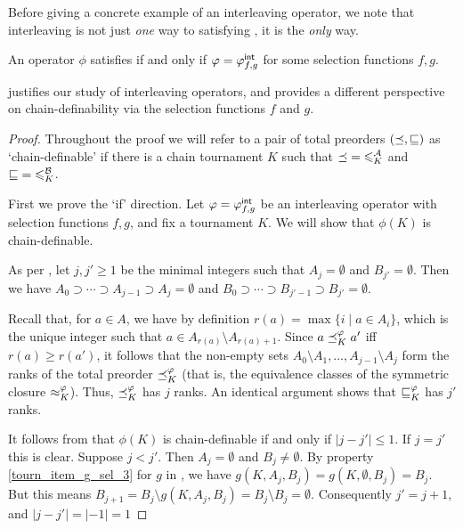 Before giving a concrete example of an interleaving operator, we note that
interleaving is not just \emph{one} way to satisfying \chaindef{}, it
is the \emph{only} way.

\begin{theorem}
   \label{tourn_result_chaindef_iff_interleaving}

    An operator $\phi$ satisfies \chaindef{} if and only if $\varphi =
    {\varphi_{f,g}^\mathsf{int}}$ for some selection functions $f, g$.

\end{theorem}

 justifies our study of interleaving
operators, and provides a different perspective on chain-definability via the
selection functions $f$ and $g$.

\begin{proof}

    Throughout the proof we will refer to a pair of total preorders
    $({\preceq}, {\sqsubseteq})$ as `chain-definable' if there is a chain tournament $K$
    such that ${\preceq} = {\leqslant^{\mathcal{A}}_K}$ and ${\sqsubseteq} = {\leqslant^{\mathcal{B}}_K}$.

    First we prove the `if' direction. Let $\varphi = {\varphi_{f,g}^\mathsf{int}}$ be an
    interleaving operator with selection functions $f, g$, and fix a
    tournament $K$. We will show that $\phi(K)$ is chain-definable.

    As per , let $j, j' \ge 1$ be the
    minimal integers such that $A_j = \emptyset$ and $B_{j'} = \emptyset$. Then
    we have $A_0 \supset \cdots \supset A_{j-1} \supset A_j = \emptyset$ and
    $B_0 \supset \cdots \supset B_{j'-1} \supset B_{j'} = \emptyset$.

    Recall that, for $a \in A$, we have by definition $r(a) = \max\{i \mid a
    \in A_i\}$, which is the unique integer such that $a \in A_{r(a)} \setminus
    A_{{r(a)}+1}$. Since $a \preceq_K^\varphi a'$ iff $r(a) \ge r(a')$, it follows
    that the non-empty sets $A_0 \setminus A_1, \ldots, A_{j-1} \setminus A_j$
    form the ranks of the total preorder ${\preceq_K^\varphi}$ (that is, the
    equivalence classes of the symmetric closure ${\approx_K^\varphi}$). Thus,
    ${\preceq_K^\varphi}$ has $j$ ranks. An identical argument shows that
    ${\sqsubseteq_K^\varphi}$ has $j'$ ranks.

    It follows from  that $\phi(K)$
    is chain-definable if and only if $|j - j'| \le 1$.  If $j = j'$ this is
    clear. Suppose $j < j'$.  Then $A_j = \emptyset$ and $B_j \ne \emptyset$.
    By property \cref{tourn_item_g_sel_3} for $g$ in
    , we have $g(K, A_j, B_j) = g(K, \emptyset,
    B_j) = B_j$. But this means $B_{j+1} = B_j \setminus g(K, A_j, B_j) = B_j
    \setminus B_j = \emptyset$.  Consequently $j' = j+1$, and $|j - j'| = |-1|
    = 1$


\end{proof}
